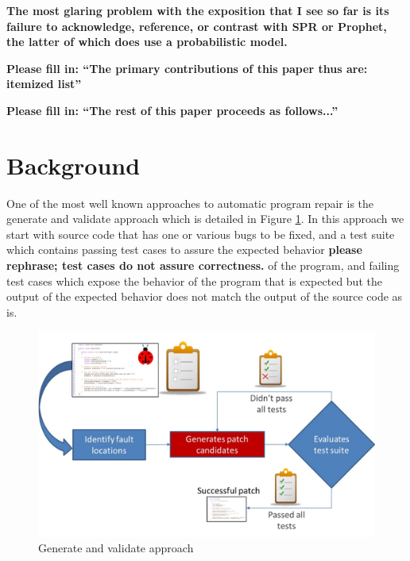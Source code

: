 \documentclass[conference]{IEEEtran}
\newcommand{\todo}[1]
  {{\scriptsize \textbf{\color{red} {#1}}}}
\begin{document}



\todo{The most glaring problem with the exposition that I see so far is its
  failure to acknowledge, reference, or contrast with SPR or Prophet, the latter of which does use a
  probabilistic model.}

\todo{Please fill in: ``The primary contributions of this paper thus are:
  itemized list''}



\todo{Please fill in: ``The rest of this paper proceeds as follows...''}

\section{Background}


One of the most well known approaches to automatic program repair is the
generate and validate approach which is detailed in Figure
\ref{fig:generateandvalidate}. In this approach we start with source code that
has one or various bugs to be fixed, and a test suite which contains passing
test cases to assure the expected behavior\todo{please rephrase; test cases do
  not assure correctness.} of the program, and failing test 
cases which expose the behavior of the program that is expected but the output
of the expected behavior does not match the output of the source code as is.



\begin{figure}[!h]
  \centering
    \includegraphics[scale=0.25]{Picture1}
  \caption{Generate and validate approach}
  \label{fig:generateandvalidate}
\end{figure}
\end{document}
